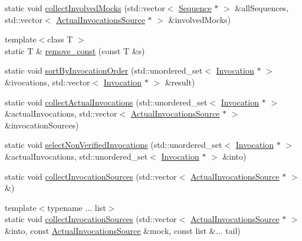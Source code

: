 \begin{DoxyCompactItemize}
\item 
static void \mbox{\hyperlink{structfakeit_1_1InvocationUtils_a8a2610f9bc4c88cb2705221970bb93d6}{collect\+Involved\+Mocks}} (std\+::vector$<$ \mbox{\hyperlink{classfakeit_1_1Sequence}{Sequence}} $\ast$ $>$ \&all\+Sequences, std\+::vector$<$ \mbox{\hyperlink{structfakeit_1_1ActualInvocationsSource}{Actual\+Invocations\+Source}} $\ast$ $>$ \&involved\+Mocks)
\item 
{\footnotesize template$<$class T $>$ }\\static T \& \mbox{\hyperlink{structfakeit_1_1InvocationUtils_ad92724e2654997a1db229644d7f2ada9}{remove\+\_\+const}} (const T \&s)
\item 
static void \mbox{\hyperlink{structfakeit_1_1InvocationUtils_a0badf7e54dd25b44d90b174d6ac39fa3}{sort\+By\+Invocation\+Order}} (std\+::unordered\+\_\+set$<$ \mbox{\hyperlink{structfakeit_1_1Invocation}{Invocation}} $\ast$ $>$ \&ivocations, std\+::vector$<$ \mbox{\hyperlink{structfakeit_1_1Invocation}{Invocation}} $\ast$ $>$ \&result)
\item 
static void \mbox{\hyperlink{structfakeit_1_1InvocationUtils_a0bb553d912e1d41f5fc1cf2d16ae9e55}{collect\+Actual\+Invocations}} (std\+::unordered\+\_\+set$<$ \mbox{\hyperlink{structfakeit_1_1Invocation}{Invocation}} $\ast$ $>$ \&actual\+Invocations, std\+::vector$<$ \mbox{\hyperlink{structfakeit_1_1ActualInvocationsSource}{Actual\+Invocations\+Source}} $\ast$ $>$ \&invocation\+Sources)
\item 
static void \mbox{\hyperlink{structfakeit_1_1InvocationUtils_a333ea33ae42d98d58c0cf5cbb9a1d3cb}{select\+Non\+Verified\+Invocations}} (std\+::unordered\+\_\+set$<$ \mbox{\hyperlink{structfakeit_1_1Invocation}{Invocation}} $\ast$ $>$ \&actual\+Invocations, std\+::unordered\+\_\+set$<$ \mbox{\hyperlink{structfakeit_1_1Invocation}{Invocation}} $\ast$ $>$ \&into)
\item 
static void \mbox{\hyperlink{structfakeit_1_1InvocationUtils_abf6eefccad9f9e43592a11ed5772c2ab}{collect\+Invocation\+Sources}} (std\+::vector$<$ \mbox{\hyperlink{structfakeit_1_1ActualInvocationsSource}{Actual\+Invocations\+Source}} $\ast$ $>$ \&)
\item 
{\footnotesize template$<$typename ... list$>$ }\\static void \mbox{\hyperlink{structfakeit_1_1InvocationUtils_aa88116bb054d94ddc8a3a942f5fc3dd2}{collect\+Invocation\+Sources}} (std\+::vector$<$ \mbox{\hyperlink{structfakeit_1_1ActualInvocationsSource}{Actual\+Invocations\+Source}} $\ast$ $>$ \&into, const \mbox{\hyperlink{structfakeit_1_1ActualInvocationsSource}{Actual\+Invocations\+Source}} \&mock, const list \&... tail)

\end{DoxyCompactItemize}
